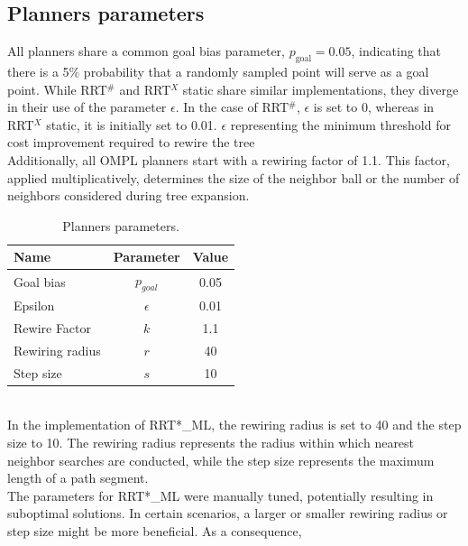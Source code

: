 \documentclass{ctuthesis}
\begin{document}
\subsection{Planners parameters}
All planners share a common goal bias parameter, \( p_{\text{goal}} = 0.05 \), 
indicating that there is a 5\% probability that a randomly sampled point 
will serve as a goal point. 
While RRT$^\#$ and RRT$^X$ static share similar implementations, 
they diverge in their use of the parameter \( \epsilon \). 
In the case of RRT$^\#$, \( \epsilon \) is set to 0, 
whereas in RRT$^X$ static, it is initially set to 0.01. 
$\epsilon$ representing the minimum
threshold for cost improvement required to rewire the tree
\\[12pt]
Additionally, all OMPL planners start with a rewiring factor of 1.1. 
This factor, applied multiplicatively, 
determines the size of the neighbor ball or the number of neighbors 
considered during tree expansion. 
\begin{table}[htbp]
  \centering
  \begin{tabular}{|p{3cm}|c|c|}
      \hline
      \textbf{Name} & \textbf{Parameter} & \textbf{Value}\\
      \hline
      Goal bias       & $p_{goal}$ & 0.05 \\
      Epsilon         & $\epsilon$ & 0.01 \\
      Rewire Factor   & $k$        & 1.1  \\
      Rewiring radius & $r$        & 40   \\
      Step size       & $s$        & 10   \\
      \hline
  \end{tabular}
  \caption{Planners parameters.}
  \label{tab:params}
\end{table}
\\
In the implementation of RRT*\_ML, 
the rewiring radius is set to 40 and the step size to 10. 
The rewiring radius represents the radius within which nearest neighbor 
searches are conducted, 
while the step size represents the maximum length of a path segment.
\\[12pt]
The parameters for RRT*\_ML were manually tuned, 
potentially resulting in suboptimal solutions. 
In certain scenarios, a larger or smaller rewiring radius or step size might be more beneficial. 
As a consequence, 
\end{document}

